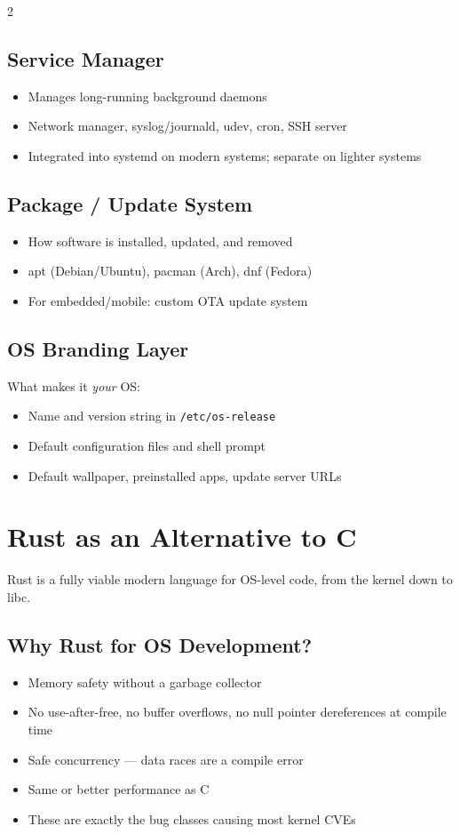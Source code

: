 2\documentclass[11pt,a4paper]{article}
\begin{document}
\subsection{Service Manager}
\begin{itemize}[noitemsep]
  \item Manages long-running background daemons
  \item Network manager, syslog/journald, udev, cron, SSH server
  \item Integrated into systemd on modern systems; separate on lighter systems
\end{itemize}

\subsection{Package / Update System}
\begin{itemize}[noitemsep]
  \item How software is installed, updated, and removed
  \item apt (Debian/Ubuntu), pacman (Arch), dnf (Fedora)
  \item For embedded/mobile: custom OTA update system
\end{itemize}

\subsection{OS Branding Layer}
What makes it \textit{your} OS:
\begin{itemize}[noitemsep]
  \item Name and version string in \texttt{/etc/os-release}
  \item Default configuration files and shell prompt
  \item Default wallpaper, preinstalled apps, update server URLs
\end{itemize}

\section{Rust as an Alternative to C}

Rust is a fully viable modern language for OS-level code, from the kernel down to libc.

\subsection{Why Rust for OS Development?}
\begin{itemize}[noitemsep]
  \item Memory safety without a garbage collector
  \item No use-after-free, no buffer overflows, no null pointer dereferences at compile time
  \item Safe concurrency --- data races are a compile error
  \item Same or better performance as C
  \item These are exactly the bug classes causing most kernel CVEs
\end{itemize}
\end{document}
